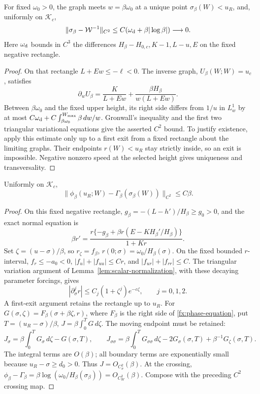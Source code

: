 \begin{lemma}\label{fx:lem-fast-inverse}
For fixed \(\omega_0>0\), the graph meets \(w=\beta\omega_0\)
at a unique point \(\sigma_\beta(W)<u_R\), and, uniformly on
\(\mathcal K_c\),
\[
 \|\sigma_\beta-\mathcal W^{-1}\|_{C^2}
     \le C(\omega_{\rm d}+\beta|\log\beta|)\longrightarrow0 .
\]
Here \(\omega_{\rm d}\) bounds in \(C^3\) the differences
\(H_\beta-H_{0,c},K-1,L-u,E\) on the fixed negative rectangle.
\end{lemma}
\begin{proof}
On that rectangle \(L+Ew\le-\ell<0\).
The inverse graph, \(U_\beta(W;W)=u_c\), satisfies
\[
 \partial_w U_\beta
       =\frac K{L+Ew}+\frac{\beta H_\beta}{w(L+Ew)} .
\]
Between \(\beta\omega_0\) and the fixed upper height, its
right side differs from \(1/u\) in \(L^1_w\) by at most
\(C\omega_{\rm d}+C\int_{\beta\omega_0}^{W_{\max}}\beta\,dw/w\).
Gronwall's inequality and the first two triangular variational
equations give the asserted \(C^2\) bound.
To justify existence, apply this estimate only up to a first exit
from a fixed rectangle about the limiting graphs. Their endpoints
\(r(W)<u_R\) stay strictly inside,
so an exit is impossible. Negative nonzero speed at the selected
height gives uniqueness and transversality.
\end{proof}

\begin{lemma}\label{fx:lem-corner}
Uniformly on \(\mathcal K_c\),
\[
 \|\phi_\beta(u_R;W)-\Gamma_\beta(\sigma_\beta(W))\|_{C^2}
       \le C\beta .
\]
\end{lemma}
\begin{proof}
On this fixed negative rectangle,
\(g_\beta=-(L-h')/H_\beta\ge g_0>0\), and the exact normal equation is
\[
 \beta r'=\frac{r\{-g_\beta+\beta r(E-KH_\beta'/H_\beta)\}}{1+Kr}.
\]
Set \(\zeta=(u-\sigma)/\beta\), so \(r_\zeta=f_\beta\),
\(r(0;\sigma)=\omega_0/H_\beta(\sigma)\). On the fixed bounded
\(r\)-interval, \(f_r\le-a_0<0\),
\(|f_u|+|f_{uu}|\le Cr\), and \(|f_{ur}|+|f_{rr}|\le C\).
The triangular variation argument of
Lemma~\ref{lem:scalar-normalization}, with these decaying parameter
forcings, gives
\[
 |\partial_\sigma^j r|\le C_j(1+\zeta^j)e^{-c\zeta},\qquad j=0,1,2.
\]
A first-exit argument retains the rectangle up to \(u_R\).
For \(G(\sigma,\zeta)=F_\beta(\sigma+\beta\zeta,r)\), where
\(F_\beta\) is the right side of \eqref{fx:phase-equation}, put
\(T=(u_R-\sigma)/\beta\), \(J=\beta\int_0^T G\,d\zeta\).
The moving endpoint must be retained:
\[
 J_\sigma=\beta\int_0^T G_\sigma\,d\zeta-G(\sigma,T),\qquad
 J_{\sigma\sigma}=\beta\int_0^T G_{\sigma\sigma}\,d\zeta
 -2G_\sigma(\sigma,T)+\beta^{-1}G_\zeta(\sigma,T).
\]
The integral terms are \(O(\beta)\); all boundary terms are
exponentially small because \(u_R-\sigma\ge d_0>0\).
Thus \(J=O_{C^2_\sigma}(\beta)\). At the crossing,
\(\phi_\beta-\Gamma_\beta
=\beta\log(\omega_0/H_\beta(\sigma_\beta))=O_{C^2_W}(\beta)\).
Compose with the preceding \(C^2\) crossing map.
\end{proof}

